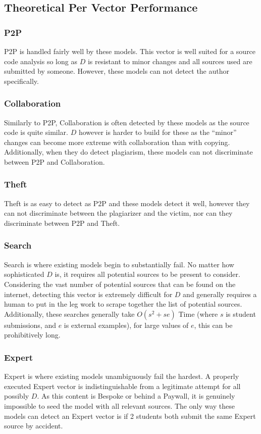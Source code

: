 \documentclass[conference]{IEEEtran}
\begin{document}
\subsection*{\textbf{Theoretical Per Vector Performance}}
	\subsubsection*{\textbf{P2P}}\hfill\break\indent
		P2P is handled fairly well by these models.  This vector is well suited for a source code analysis so long as $D$ is resistant to minor changes and all sources used are submitted by someone.  However, these models can not detect the author specifically.
	\subsubsection*{\textbf{Collaboration}}\hfill\break\indent
		Similarly to P2P, Collaboration is often detected by these models as the source code is quite similar.  $D$ however is harder to build for these as the ``minor'' changes can become more extreme with collaboration than with copying.  Additionally, when they do detect plagiarism, these models can not discriminate between P2P and Collaboration.
	\subsubsection*{\textbf{Theft}}\hfill\break\indent
		Theft is as easy to detect as P2P and these models detect it well, however they can not discriminate between the plagiarizer and the victim, nor can they discriminate between P2P and Theft.
	\subsubsection*{\textbf{Search}}\hfill\break\indent
		Search is where existing models begin to substantially fail.  No matter how sophisticated $D$ is, it requires all potential sources to be present to consider.  Considering the vast number of potential sources that can be found on the internet, detecting this vector is extremely difficult for $D$ and generally requires a human to put in the leg work to scrape together the list of potential sources.  Additionally, these searches generally take $O(s^2+se)$ Time (where $s$ is student submissions, and $e$ is external examples), for large values of $e$, this can be prohibitively long.
	\subsubsection*{\textbf{Expert} }\hfill\break\indent
	Expert is where existing models unambiguously fail the hardest.  A properly executed Expert vector is indistinguishable from a legitimate attempt for all possibly $D$.  As this content is Bespoke or behind a Paywall, it is genuinely impossible to seed the model with all relevant sources.  The only way these models can detect an Expert vector is if 2 students both submit the same Expert source by accident.
\end{document}
